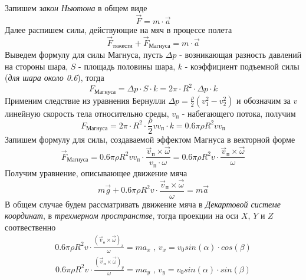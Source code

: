 \documentclass[a5paper, 10pt]{article}
\theoremstyle{definition}
\theoremstyle{plain}
\theoremstyle{remark}
\begin{document}
Запишем \textit{закон Ньютона} в общем виде
\begin{equation}
\vec{F} = m \cdot \vec{a}
\end{equation}
Далее распишем силы, действующие на мяч в процессе полета
\begin{equation}
\vec{F}_{\text{тяжести}} + \vec{F}_{\text{Магнуса}}= m \cdot \vec{a}
\end{equation}
Выведем формулу для силы Магнуса, пусть $\Delta p $ - возникающая разность давлений на стороны шара, $S$ - площадь половины шара,  $k$ - коэффициент подъемной силы (\textit{для шара около 0.6}), тогда
\begin{equation}
F_{\text{Магнуса}}= \Delta p \cdot S\cdot k = 2 \pi \cdot R^{2} \cdot \Delta p \cdot k
\end{equation}
Применим следствие из уравнения Бернулли $\Delta p = \frac{\rho}{2} \left( v^{2}_{1}- v^{2}_{2} \right)$ и обозначим за $v$ линейную скорость тела относительно среды, $v_{\text{п}}$ - набегающего потока, получим
\begin{equation}
F_{\text{Магнуса}}= 2 \pi \cdot R^{2} \cdot \frac{\rho}{2} v v_{\text{п}} \cdot k = 0.6 \pi \rho  R^{2}  v v_{\text{п}}
\end{equation}
Запишем формулу для силы, создаваемой эффектом Магнуса в векторной форме
\begin{equation}
\vec{F}_{\text{Магнуса}}= 0.6 \pi \rho  R^{2} v v_{\text{п}} \cdot  \frac{   \vec{v}_{\text{п}} \times \vec{\omega}}{ v_{\text{п}} \cdot \omega} = 0.6 \pi \rho  R^{2} v  \cdot  \frac{   \vec{v}_{\text{п}} \times \vec{\omega}}{  \omega}
\end{equation}
Получим уравнение, описывающее движение мяча
\begin{equation}
m \vec{g}  +0.6 \pi \rho  R^{2} v  \cdot  \frac{   \vec{v}_{\text{п}} \times \vec{\omega}}{  \omega} = m \vec{a}
\end{equation}
В общем случае будем рассматривать движение мяча в \textit{Декартовой системе координат}, в \textit{трехмерном пространстве}, тогда проекции на оси $X$, $Y$ и $Z$ соотвественно
\begin{multline}
0.6 \pi \rho  R^{2} v  \cdot  \frac{  \left( \vec{v}_{\text{п}} \times \vec{\omega} \right)_{x}}{  \omega} = m a_{x} \text{ , } v_{x} = v_0 sin \left( \alpha \right) \cdot cos  \left( \beta \right)
\end{multline}
\begin{multline}
0.6 \pi \rho  R^{2} v  \cdot  \frac{  \left( \vec{v}_{\text{п}} \times \vec{\omega} \right)_{y}}{  \omega} = m a_{y} \text{ , } v_{y} = v_0 sin \left( \alpha \right) \cdot sin  \left( \beta \right)
\end{multline}
\end{document}
